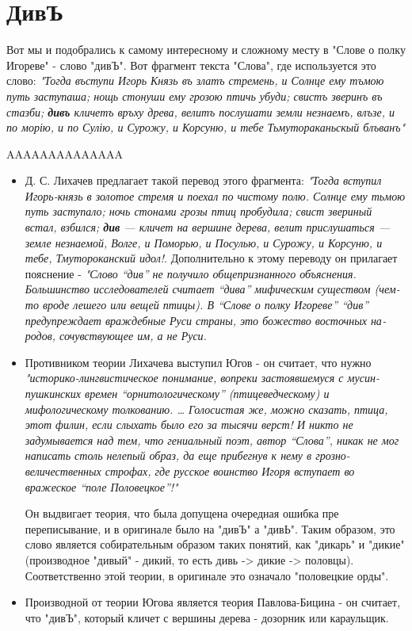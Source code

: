 \documentclass[14pt, a4paper]{article}
\begin{document}
{\section{ДивЪ}
Вот мы и подобрались к самому интересному и сложному месту в "Слове о полку Игореве" - слово "дивЪ". Вот фрагмент текста "Слова", где используется это слово: {\itshape "Тогда въступи Игорь Князь въ златъ стремень, и Солнце ему тъмою путь заступаша; нощь стонуши ему грозою птичь убуди; свистъ зверинъ въ стазби; {\bfseries дивъ} кличетъ връху древа, велитъ послушати земли незнаемъ, влъзе, и по морію, и по Сулію, и Сурожу, и Корсуню, и тебе Тьмутораканьскый блъванъ"}
\par AAAAAAAAAAAAAA
\begin{itemize}
  \item Д. С. Лихачев предлагает такой перевод этого фрагмента: {\itshape "Тогда вступил Игорь-князь в золотое стре­мя и поехал по чистому полю. Солнце ему тьмою путь засту­пало; ночь стонами грозы птиц пробудила; свист звериный встал, взбился; {\bfseries див} — кличет на вершине дерева, велит прислушаться — земле незнаемой, Волге, и Поморью, и Посулью, и Сурожу, и Корсуню, и тебе, Тмутороканский идол!}. Дополнительно к этому переводу он прилагает пояснение - {\itshape "Слово “див” не получило обще­признанного объяснения. Большинство исследователей счита­ет “дива” мифическим существом (чем-то вроде лешего или вещей птицы). В “Слове о полку Игореве” “див” предупреждает враждебные Руси страны, это божество восточных на­родов, сочувствующее им, а не Руси.}
  \item Противником теории Лихачева выступил Югов - он считает, что нужно {\itshape "историко-лингвистическое понимание, вопреки застоявшемуся с мусин-пушкинских времен “орнитологическому” (птицеведческому) и мифологическому толкованию. … Голосистая же, можно сказать, птица, этот филин, если слыхать было его за тысячи верст! И никто не задумывается над тем, что гениальный поэт, автор “Слова”, никак не мог написать столь нелепый образ, да еще прибегнув к нему в грозно-величественных строфах, где русское воинство Игоря вступает во вражеское “поле Поло­вецкое”!"}
  \par Он выдвигает теория, что была допущена очередная ошибка пре переписывание, и в оригинале было на "дивЪ" а "дивЬ". Таким образом, это слово является собирательным образом таких понятий, как "дикарь" и "дикие" (производное "дивый" - дикий, то есть дивь -> дикие -> половцы). Соответственно этой теории, в оригинале это означало "половецкие орды".
  \item Производной от теории Югова является теория Павлова-Бицина - он считает, что "дивЪ", который кличет с вершины дерева - дозорник или караульщик.

\end{itemize}}
\end{document}
